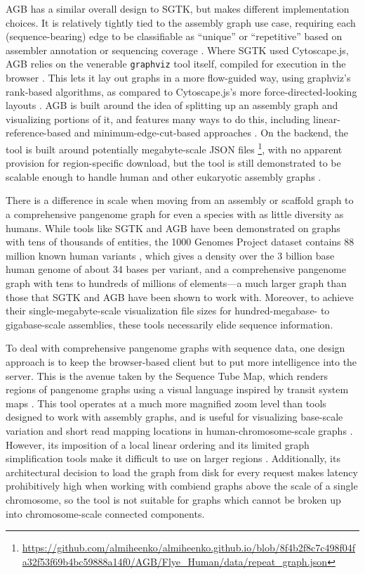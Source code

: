 AGB has a similar overall design to SGTK, but makes different implementation choices.
It is relatively tightly tied to the assembly graph use case, requiring each (sequence-bearing) edge to be classifiable as ``unique'' or ``repetitive'' based on assembler annotation or sequencing coverage \citep{Mikheenko_2019}.
Where SGTK used Cytoscape.js, AGB relies on the venerable \texttt{graphviz} tool itself, compiled for execution in the browser \citep{Mikheenko_2019, Ellson_2001}.
This lets it lay out graphs in a more flow-guided way, using graphviz's rank-based algorithms, as compared to Cytoscape.js's more force-directed-looking layouts \citep{Mikheenko_2019, Kunyavskaya_2018}.
AGB is built around the idea of splitting up an assembly graph and visualizing portions of it, and features many ways to do this, including linear-reference-based and minimum-edge-cut-based approaches \citep{Mikheenko_2019}.
On the backend, the tool is built around potentially megabyte-scale JSON files \footnote{\url{https://github.com/almiheenko/almiheenko.github.io/blob/8f4b2f8c7c498f04fa32f53f69b4bc59888a14f0/AGB/Flye_Human/data/repeat_graph.json}}, with no apparent provision for region-specific download, but the tool is still demonstrated to be scalable enough to handle human and other eukaryotic assembly graphs \citep{Mikheenko_2019}.

There is a difference in scale when moving from an assembly or scaffold graph to a comprehensive pangenome graph for even a species with as little diversity as humans.
While tools like SGTK and AGB have been demonstrated on graphs with tens of thousands of entities, the 1000 Genomes Project dataset contains 88 million known human variants \citep{1000_2015}, which gives a density over the 3 billion base human genome of about 34 bases per variant, and a comprehensive pangenome graph with tens to hundreds of millions of elements---a much larger graph than those that SGTK and AGB have been shown to work with.
Moreover, to achieve their single-megabyte-scale visualization file sizes for hundred-megabase- to gigabase-scale assemblies, these tools necessarily elide sequence information.

To deal with comprehensive pangenome graphs with sequence data, one design approach is to keep the browser-based client but to put more intelligence into the server.
This is the avenue taken by the Sequence Tube Map, which renders regions of pangenome graphs using a visual language inspired by transit system maps \citep{Beyer_2019}.
This tool operates at a much more magnified zoom level than tools designed to work with assembly graphs, and is useful for visualizing base-scale variation and short read mapping locations in human-chromosome-scale graphs \citep{Beyer_2019}.
However, its imposition of a local linear ordering and its limited graph simplification tools make it difficult to use on larger regions \citep{Beyer_2019}.
Additionally, its architectural decision to load the graph from disk for every request makes latency prohibitively high when working with combiend graphs above the scale of a single chromosome, so the tool is not suitable for graphs which cannot be broken up into chromosome-scale connected components.

